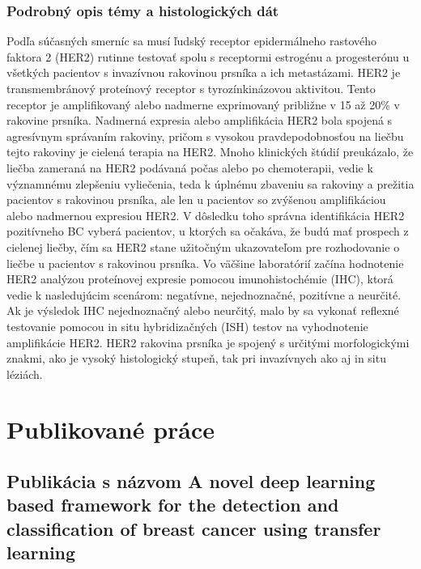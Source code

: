 \subsubsection{Podrobný opis témy a histologických dát} \label{HE2protein}
\hspace{10mm}Podľa súčasných smerníc sa musí ľudský receptor epidermálneho rastového faktora 2 (HER2) rutinne testovať spolu s receptormi estrogénu a progesterónu u všetkých pacientov s invazívnou rakovinou prsníka a ich metastázami. HER2 je transmembránový proteínový receptor s tyrozínkinázovou aktivitou. Tento receptor je amplifikovaný alebo nadmerne exprimovaný približne v 15 až 20\% v rakovine prsníka. Nadmerná expresia alebo amplifikácia HER2 bola spojená s agresívnym správaním rakoviny, pričom s vysokou pravdepodobnosťou na liečbu tejto rakoviny je cielená terapia na HER2. Mnoho klinických štúdií preukázalo, že liečba zameraná na HER2 podávaná počas alebo po chemoterapii, vedie k významnému zlepšeniu vyliečenia, teda k úplnému zbaveniu sa rakoviny a prežitia pacientov s rakovinou prsníka, ale len u pacientov so zvýšenou amplifikáciou alebo nadmernou expresiou HER2. V dôsledku toho správna identifikácia HER2 pozitívneho BC vyberá pacientov, u ktorých sa očakáva, že budú mať prospech z cielenej liečby, čím sa HER2 stane užitočným ukazovateľom pre rozhodovanie o liečbe u pacientov s rakovinou prsníka. Vo väčšine laboratórií začína hodnotenie HER2 analýzou proteínovej expresie pomocou imunohistochémie (IHC), ktorá vedie k nasledujúcim scenárom: negatívne, nejednoznačné, pozitívne a neurčité. Ak je výsledok IHC nejednoznačný alebo neurčitý, malo by sa vykonať reflexné testovanie pomocou in situ hybridizačných (ISH) testov na vyhodnotenie amplifikácie HER2. HER2 rakovina prsníka  je spojený s určitými morfologickými znakmi, ako je vysoký histologický stupeň, tak pri invazívnych  ako aj in situ léziách.
 \cite{ECDP2020}

\section{Publikované práce}

\subsection{Publikácia s názvom A novel deep learning based framework for the detection and classification of breast cancer using transfer learning}

